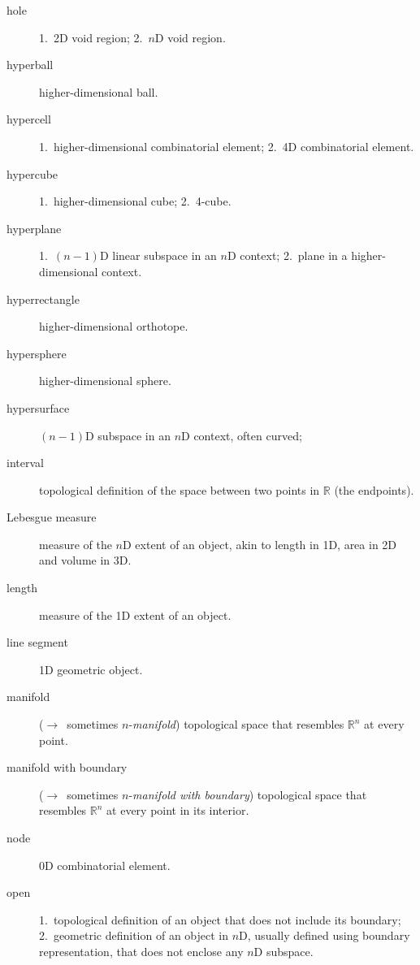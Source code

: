\begin{multicols}{2}
\begin{description}
\item[hole]
1.\ 2D void region;
2.\ $n$D void region.

\item[hyperball]
higher-dimensional ball.

\item[hypercell]
1.\ higher-dimensional combinatorial element;
2.\ 4D combinatorial element.

\item[hypercube]
1.\ higher-dimensional cube;
2.\ 4-cube.

\item[hyperplane]
1.\ $(n-1)$D linear subspace in an $n$D context;
{\color{gray} 2.\ plane in a higher-dimensional context.}

\item[hyperrectangle]
higher-dimensional orthotope.

\item[hypersphere]
higher-dimensional sphere.

\item[hypersurface]
$(n-1)$D subspace in an $n$D context, often curved;

\item[interval]
topological definition of the space between two points in $\mathbb{R}$ (the endpoints).

\item[Lebesgue measure]
measure of the $n$D extent of an object, akin to length in 1D, area in 2D and volume in 3D.

\item[length]
measure of the 1D extent of an object.

\item[line segment]
1D geometric object.

\item[manifold]
($\rightarrow$\ sometimes $n$-\emph{manifold}) topological space that resembles $\mathbb{R}^n$ at every point.

\item[manifold with boundary]
($\rightarrow$\ sometimes $n$-\emph{manifold with boundary}) topological space that resembles $\mathbb{R}^n$ at every point in its interior.

\item[node]
0D combinatorial element.

\item[open]
1.\ topological definition of an object that does not include its boundary;
2.\ geometric definition of an object in $n$D, usually defined using boundary representation, that does not enclose any $n$D subspace.


\end{description}
\end{multicols}
